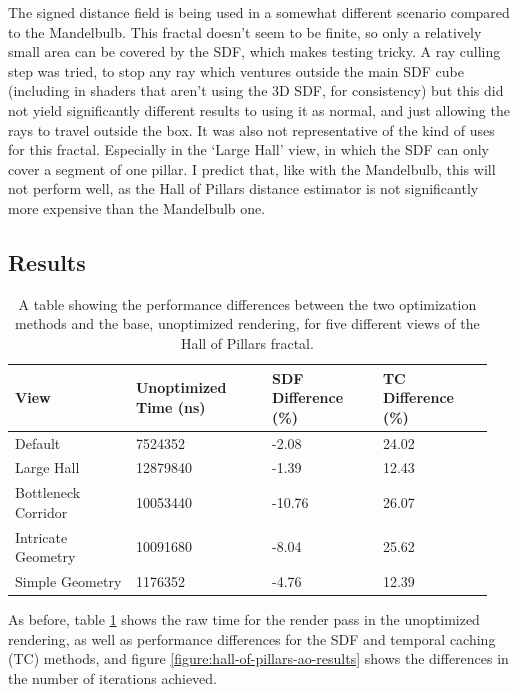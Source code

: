 The signed distance field is being used in a somewhat different scenario compared to the Mandelbulb. This fractal doesn't seem to be finite, so only a relatively small area can be covered by the SDF, which makes testing tricky. A ray culling step was tried, to stop any ray which ventures outside the main SDF cube (including in shaders that aren't using the 3D SDF, for consistency) but this did not yield significantly different results to using it as normal, and just allowing the rays to travel outside the box. It was also not representative of the kind of uses for this fractal. Especially in the `Large Hall' view, in which the SDF can only cover a segment of one pillar. I predict that, like with the Mandelbulb, this will not perform well, as the Hall of Pillars distance estimator is not significantly more expensive than the Mandelbulb one.

\subsection{Results}

\begin{table}[ht]
	\centering
	\begin{tabular}{||p{0.24\linewidth}|p{0.27\linewidth}|p{0.22\linewidth}|p{0.22\linewidth}||}
		\hline
		View & Unoptimized Time (ns) & SDF Difference (\%) & TC Difference (\%)\\
		\hline\hline
		Default & 7524352 & -2.08 & 24.02\\
		\hline
		Large Hall & 12879840 & -1.39 & 12.43\\
		\hline
		Bottleneck Corridor & 10053440 & -10.76 & 26.07\\
		\hline
		Intricate Geometry & 10091680 & -8.04 & 25.62\\
		\hline
		Simple Geometry & 1176352 & -4.76 & 12.39\\
		\hline
	\end{tabular}
	\caption{A table showing the performance differences between the two optimization methods and the base, unoptimized rendering, for five different views of the Hall of Pillars fractal.}
	\label{table:hall-of-pillars-static-results}
\end{table}

As before, table \ref{table:hall-of-pillars-static-results} shows the raw time for the render pass in the unoptimized rendering, as well as performance differences for the SDF and temporal caching (TC) methods, and figure \ref{figure:hall-of-pillars-ao-results} shows the differences in the number of iterations achieved.

